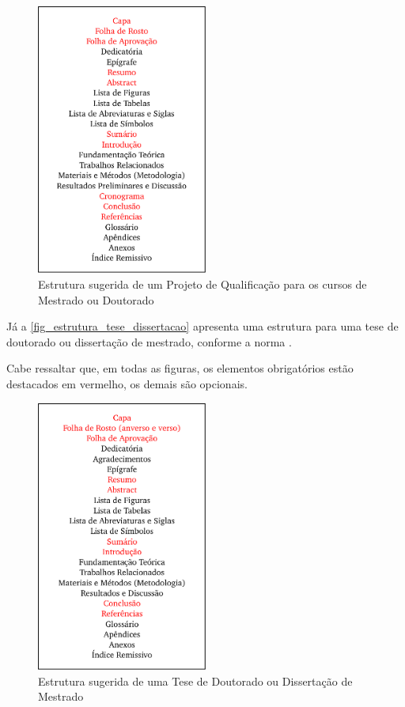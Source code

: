 \begin{apendicesenv}
    \begin{figure}[!htb]
        \centering
        \caption{Estrutura sugerida de um Projeto de Qualificação para os cursos de Mestrado ou Doutorado}
        \label{fig_estrutura_projeto_qualificacao}
        \includegraphics[width=0.5\textwidth]{figuras/estrutura_projeto_qualificacao}
    \end{figure}

    Já a \autoref{fig_estrutura_tese_dissertacao} apresenta uma estrutura para uma tese de doutorado ou dissertação de mestrado, conforme a norma .

    Cabe ressaltar que, em todas as figuras, os elementos obrigatórios estão destacados em vermelho, os demais são opcionais.

    \begin{figure}[!htb]
        \centering
        \caption{Estrutura sugerida de uma Tese de Doutorado ou Dissertação de Mestrado}
        \label{fig_estrutura_tese_dissertacao}
        \includegraphics[width=0.5\textwidth]{figuras/estrutura_tese_dissertacao}
    \end{figure}


\end{apendicesenv}
